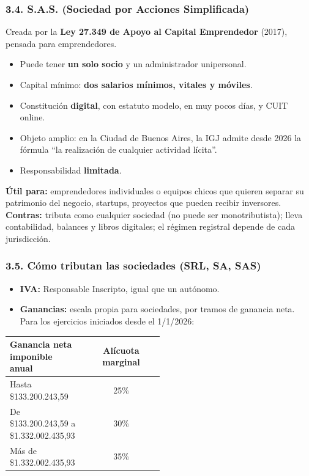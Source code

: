 \subsubsection*{3.4. S.A.S. (Sociedad por Acciones Simplificada)}
Creada por la \textbf{Ley 27.349 de Apoyo al Capital Emprendedor} (2017), pensada para
emprendedores.
\begin{itemize}
  \item Puede tener \textbf{un solo socio} y un administrador unipersonal.
  \item Capital mínimo: \textbf{dos salarios mínimos, vitales y móviles}.
  \item Constitución \textbf{digital}, con estatuto modelo, en muy pocos días, y CUIT online.
  \item Objeto amplio: en la Ciudad de Buenos Aires, la IGJ admite desde 2026 la fórmula
        ``la realización de cualquier actividad lícita''.
  \item Responsabilidad \textbf{limitada}.
\end{itemize}
\textbf{Útil para:} emprendedores individuales o equipos chicos que quieren separar su
patrimonio del negocio, startups, proyectos que pueden recibir inversores.
\textbf{Contras:} tributa como cualquier sociedad (no puede ser monotributista); lleva
contabilidad, balances y libros digitales; el régimen registral depende de cada jurisdicción.

\subsubsection*{3.5. Cómo tributan las sociedades (SRL, SA, SAS)}
\begin{itemize}
  \item \textbf{IVA:} Responsable Inscripto, igual que un autónomo.
  \item \textbf{Ganancias:} escala propia para sociedades, por tramos de ganancia neta. Para los
        ejercicios iniciados desde el 1/1/2026:
\end{itemize}

\begin{center}
\small
\begin{tabular}{|p{0.50\linewidth}|c|}
\hline
\textbf{Ganancia neta imponible anual} & \textbf{Alícuota marginal} \\ \hline
Hasta \$133.200.243,59 & 25\% \\ \hline
De \$133.200.243,59 a \$1.332.002.435,93 & 30\% \\ \hline
Más de \$1.332.002.435,93 & 35\% \\ \hline
\end{tabular}
\end{center}

